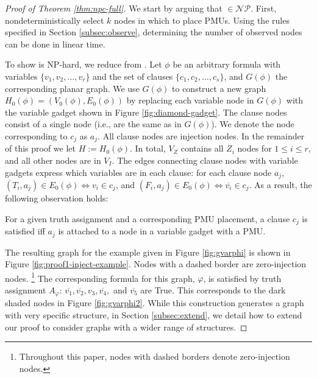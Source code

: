 \begin{proof}[Proof of Theorem \ref{thm:npc-full}]
We start by arguing that \full $\in \mathcal{NP}$. First, nondeterministically select $k$ nodes in which to place PMUs. Using the rules specified in Section \ref{subsec:observe}, determining
the number of observed nodes can be done in linear time.

To show \full is NP-hard, we reduce from \sats.  Let $\phi$ be an arbitrary \sat formula with variables 
$\{v_1,v_2, \dots , v_r\}$ and the set of clauses $\{c_1,c_2,\dots , c_s \}$, and $G(\phi)$ the corresponding planar graph. We use $G(\phi)$ to construct a new graph $H_0(\phi) = (V_0(\phi), E_0(\phi))$ by replacing each variable
node in $G(\phi)$ with the variable gadget shown in Figure \ref{fig:diamond-gadget}. The clause nodes consist of a single node (i.e., are the same
as in $G(\phi)$). We denote the node corresponding to $c_j$ as $a_j$. All clause nodes are injection nodes.  In the remainder of this proof we let $H := H_0(\phi)$.
In total, $V_Z$ contains all $Z_i$ nodes for $1 \leq i \leq r$, and all other nodes are in $V_I$.  The edges connecting clause nodes with variable gadgets express which variables are in each clause: for each clause node $a_j$, $(T_i, a_j)\in E_0(\phi) \Leftrightarrow v_i\in c_j$, and $(F_i, a_j)\in E_0(\phi) \Leftrightarrow \overline{v_i}\in c_j$. As a result, the following observation holds:

\begin{observation}\label{obs:1}
For a given truth assignment and a corresponding PMU placement, a clause $c_j$ is satisfied iff $a_j$ is attached to a node in a variable gadget with a PMU. 
\end{observation}


The resulting graph for the example given in Figure \ref{fig:gvarphi} is shown in Figure \ref{fig:proof1-inject-example}.  Nodes with a dashed border are zero-injection nodes. 
{\footnote {\small  Throughout this paper, nodes with dashed borders denote zero-injection nodes. }} 
The corresponding formula for this graph, $\varphi$,
is satisfied by truth assignment $A_{\varphi}$: $\overline{v_1}, \overline{v_2}, v_3, \overline{v_4},$ and $\overline{v_5}$ are True. This corresponds to the dark shaded nodes in Figure
\ref{fig:gvarphi2}. While this construction generates a graph with very specific structure, in Section \ref{subsec:extend}, we detail how to extend our proof to consider graphs with a wider range of structures.%



\end{proof}
